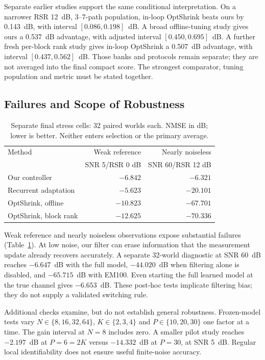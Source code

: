 \documentclass[10pt,journal,letterpaper]{IEEEtran}
\begin{document}
Separate earlier studies support the same conditional interpretation. On a narrower RSR 12~dB, 3--7-path population, in-loop OptShrink beats ours by 0.143~dB, with interval $[0.086,0.198]$~dB. A broad offline-tuning study gives ours a 0.537~dB advantage, with adjusted interval $[0.450,0.695]$~dB. A further fresh per-block rank study gives in-loop OptShrink a 0.507~dB advantage, with interval $[0.437,0.562]$~dB. Those banks and protocols remain separate; they are not averaged into the final compact score. The strongest comparator, tuning population and metric must be stated together.

\subsection{Failures and Scope of Robustness}
\begin{table}[!t]
\caption{Separate final stress cells: 32 paired worlds each. NMSE in dB; lower is better. Neither enters selection or the primary average.}
\label{tab:stress}\centering\footnotesize\setlength{\tabcolsep}{4pt}
\begin{tabular}{@{}lrr@{}}\toprule
Method & Weak reference & Nearly noiseless\\
 & SNR 5/RSR 0 dB & SNR 60/RSR 12 dB\\\midrule
Our controller & $-6.842$ & $-6.321$\\
Recurrent adaptation & $-5.623$ & $-20.101$\\
OptShrink, offline & $-10.823$ & $-67.701$\\
OptShrink, block rank & $-12.625$ & $-70.336$\\\bottomrule
\end{tabular}
\end{table}
Weak reference and nearly noiseless observations expose substantial failures (Table~\ref{tab:stress}). At low noise, our filter can erase information that the measurement update already recovers accurately. A separate 32-world diagnostic at SNR 60~dB reaches $-6.647$~dB with the full model, $-44.020$~dB when filtering alone is disabled, and $-65.715$~dB with EM100. Even starting the full learned model at the true channel gives $-6.653$~dB. These post-hoc tests implicate filtering bias; they do not supply a validated switching rule.

Additional checks examine, but do not establish general robustness. Frozen-model tests vary $N\in\{8,16,32,64\}$, $K\in\{2,3,4\}$ and $P\in\{10,20,30\}$ one factor at a time. The gain interval at $N=8$ includes zero. A smaller pilot study reaches $-2.197$~dB at $P=6=2K$ versus $-14.332$~dB at $P=30$, at SNR 5~dB. Regular local identifiability does not ensure useful finite-noise accuracy.
\end{document}
